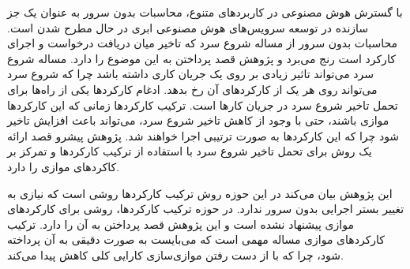 

با گسترش هوش مصنوعی در کاربردهای متنوع، محاسبات بدون سرور به عنوان یک جز سازنده در توسعه سرویس‌های هوش مصنوعی ابری در حال مطرح شدن است.
محاسبات بدون سرور از مساله شروع سرد که تاخیر میان دریافت درخواست و اجرای کارکرد است رنج می‌برد و پژوهش  قصد پرداختن به این موضوع را دارد.
مساله شروع سرد می‌تواند تاثیر زیادی بر روی یک جریان کاری داشته باشد چرا که شروع سرد می‌تواند روی هر یک از کارکردهای آن رخ بدهد.
ادغام کارکردها یکی از راه‌ها برای تحمل تاخیر شروع سرد در جریان کارها است.
ترکیب کارکردها زمانی که این کارکردها موازی باشند، حتی با وجود از کاهش تاخیر شروع سرد،
می‌تواند باعث افزایش تاخیر شود چرا که این کارکردها به صورت ترتیبی اجرا خواهند شد.
پژوهش پیشرو قصد ارائه یک روش برای تحمل تاخیر شروع سرد با استفاده از ترکیب کارکردها و تمرکز بر کاکردهای موازی را دارد.

این پژوهش بیان می‌کند در این حوزه روش ترکیب کارکردها روشی است که نیازی به تغییر بستر اجرایی بدون سرور ندارد.
در حوزه ترکیب کارکردها، روشی برای کارکردهای موازی پیشنهاد نشده است و این پژوهش قصد پرداختن به آن را دارد.
ترکیب کارکردهای موازی مساله مهمی است که می‌بایست به صورت دقیقی به آن پرداخته شود، چرا که با از دست رفتن موازی‌سازی کارایی کلی کاهش پیدا می‌کند.
